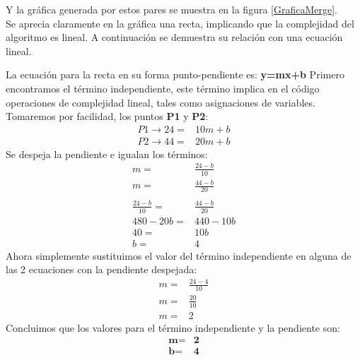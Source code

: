     Y la gráfica generada por estos pares se muestra en la figura \ref{GraficaMerge}.\\
    
    Se aprecia claramente en la gráfica una recta, implicando que la complejidad del algoritmo es lineal. A continuación se demuestra su relación con una ecuación lineal.\\
    
\hfill \break
\hfill \break
\hfill \break
\hfill \break

    La ecuación para la recta en su forma punto-pendiente es: \textbf{y=mx+b}
    Primero encontramos el término independiente, este término implica en el código operaciones de complejidad lineal, tales como asignaciones de variables.\\
    
    Tomaremos por facilidad, los puntos \textbf{P1} y \textbf{P2}:\\
    \begin{equation*}
        \begin{split}
            P1 \rightarrow 24= & 10m + b \\
            P2 \rightarrow 44= & 20m + b
        \end{split}
    \end{equation*}
    Se despeja la pendiente e igualan los términos:\\
    \begin{equation*}
        \begin{split}
            m= & \frac{24-b}{10} \\
            m= & \frac{44-b}{20} \\
            \\
            \frac{24-b}{10}= & \frac{44-b}{20}\\
            480-20b= & 440-10b\\
            40= & 10b\\
            b= & 4
        \end{split}
    \end{equation*}
    Ahora simplemente sustituimos el valor del término independiente en alguna de las 2 ecuaciones con la pendiente despejada:
    \begin{equation*}
        \begin{split}
            m=& \frac{24-4}{10}\\
            m=& \frac{20}{10}\\
            m=& 2
        \end{split}
    \end{equation*}
    Concluimos que los valores para el término independiente y la pendiente son:
    \begin{equation*}
        \begin{split}
            \textbf{m=} & \textbf{2}\\
            \textbf{b=} & \textbf{4}
        \end{split}
    \end{equation*}
    
